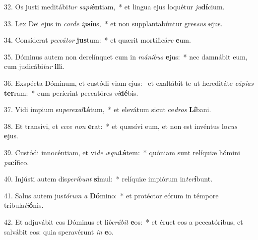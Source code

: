 32. Os justi meditábi\textit{tur} \textit{sa}\textit{pi}\textbf{én}tiam,~*  et lingua ejus loquétur \textit{ju}\textbf{dí}cium.\

33. Lex Dei ejus in \textit{cor}\textit{de} \textit{ip}\textbf{sí}us,~*  et non supplantabúntur gres\textit{sus} \textbf{e}jus.\

34. Consíderat \textit{pec}\textit{cá}\textit{tor} \textbf{jus}tum:~*  et quærit mortificá\textit{re} \textbf{e}um.\

35. Dóminus autem non derelínquet eum in \textit{má}\textit{ni}\textit{bus} \textbf{e}jus:~*  nec damnábit eum, cum judicábi\textit{tur} \textbf{il}li.\

36. Exspécta Dóminum, et custódi viam ejus: \dag\  et exaltábit te ut hereditáte \textit{cá}\textit{pi}\textit{as} \textbf{ter}ram:~*  cum períerint peccatóres \textit{vi}\textbf{dé}bis.\

37. Vidi ímpium su\textit{per}\textit{ex}\textit{al}\textbf{tá}tum,~*  et elevátum sicut ce\textit{dros} \textbf{Lí}bani.\

38. Et transívi, et \textit{ec}\textit{ce} \textit{non} \textbf{e}rat:~*  et quæsívi eum, et non est invéntus lo\textit{cus} \textbf{e}jus.\

39. Custódi innocéntiam, et vi\textit{de} \textit{æ}\textit{qui}\textbf{tá}tem:~*  quóniam sunt relíquiæ hómini \textit{pa}\textbf{cí}fico.\

40. Injústi autem dis\textit{per}\textit{í}\textit{bunt} \textbf{si}mul:~*  relíquiæ impiórum in\textit{ter}\textbf{í}bunt.\

41. Salus autem jus\textit{tó}\textit{rum} \textit{a} \textbf{Dó}mino:~*  et protéctor eórum in témpore tribula\textit{ti}\textbf{ó}nis.\

42. Et adjuvábit eos Dóminus et li\textit{be}\textit{rá}\textit{bit} \textbf{e}os:~*  et éruet eos a peccatóribus, et salvábit eos: quia speravérunt \textit{in} \textbf{e}o.\

